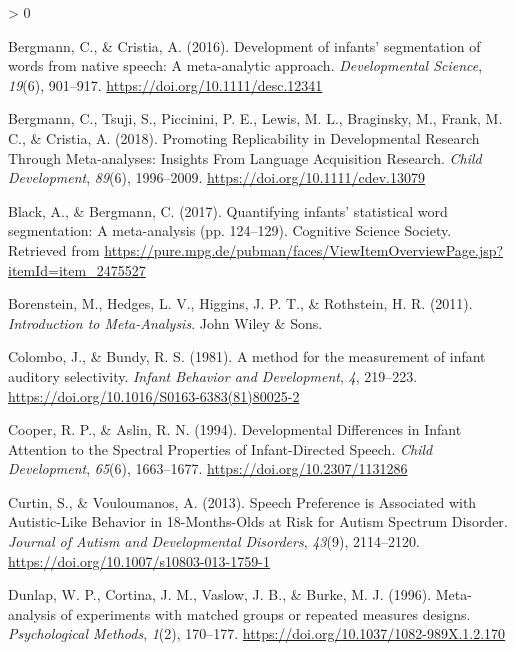\documentclass[
  english,
  man]{apa6}
\newlength{\cslhangindent}
\newenvironment{CSLReferences}[2] %
 {%
  \setlength{\parindent}{0pt}
  \ifodd #1 \everypar{\setlength{\hangindent}{\cslhangindent}}\ignorespaces\fi
  \ifnum #2 > 0
  \setlength{\parskip}{#2\baselineskip}
  \fi
 }%
 {}
\begin{document}
\hypertarget{refs}{}
\begin{CSLReferences}{1}{0}
\leavevmode\hypertarget{ref-bergmann_development_2016}{}%
Bergmann, C., \& Cristia, A. (2016). Development of infants' segmentation of words from native speech: A meta-analytic approach. \emph{Developmental Science}, \emph{19}(6), 901--917. \url{https://doi.org/10.1111/desc.12341}

\leavevmode\hypertarget{ref-bergmann_promoting_2018}{}%
Bergmann, C., Tsuji, S., Piccinini, P. E., Lewis, M. L., Braginsky, M., Frank, M. C., \& Cristia, A. (2018). Promoting {Replicability} in {Developmental} {Research} {Through} {Meta}-analyses: {Insights} {From} {Language} {Acquisition} {Research}. \emph{Child Development}, \emph{89}(6), 1996--2009. \url{https://doi.org/10.1111/cdev.13079}

\leavevmode\hypertarget{ref-black_quantifying_2017}{}%
Black, A., \& Bergmann, C. (2017). Quantifying infants' statistical word segmentation: {A} meta-analysis (pp. 124--129). Cognitive Science Society. Retrieved from \url{https://pure.mpg.de/pubman/faces/ViewItemOverviewPage.jsp?itemId=item_2475527}

\leavevmode\hypertarget{ref-borenstein_introduction_2011}{}%
Borenstein, M., Hedges, L. V., Higgins, J. P. T., \& Rothstein, H. R. (2011). \emph{Introduction to {Meta}-{Analysis}}. John Wiley \& Sons.

\leavevmode\hypertarget{ref-colombo_method_1981}{}%
Colombo, J., \& Bundy, R. S. (1981). A method for the measurement of infant auditory selectivity. \emph{Infant Behavior and Development}, \emph{4}, 219--223. \url{https://doi.org/10.1016/S0163-6383(81)80025-2}

\leavevmode\hypertarget{ref-cooper_developmental_1994}{}%
Cooper, R. P., \& Aslin, R. N. (1994). Developmental {Differences} in {Infant} {Attention} to the {Spectral} {Properties} of {Infant}-{Directed} {Speech}. \emph{Child Development}, \emph{65}(6), 1663--1677. \url{https://doi.org/10.2307/1131286}

\leavevmode\hypertarget{ref-curtin_speech_2013}{}%
Curtin, S., \& Vouloumanos, A. (2013). Speech {Preference} is {Associated} with {Autistic}-{Like} {Behavior} in 18-{Months}-{Olds} at {Risk} for {Autism} {Spectrum} {Disorder}. \emph{Journal of Autism and Developmental Disorders}, \emph{43}(9), 2114--2120. \url{https://doi.org/10.1007/s10803-013-1759-1}

\leavevmode\hypertarget{ref-dunlap_meta-analysis_1996}{}%
Dunlap, W. P., Cortina, J. M., Vaslow, J. B., \& Burke, M. J. (1996). Meta-analysis of experiments with matched groups or repeated measures designs. \emph{Psychological Methods}, \emph{1}(2), 170--177. \url{https://doi.org/10.1037/1082-989X.1.2.170}


\end{CSLReferences}
\end{document}
